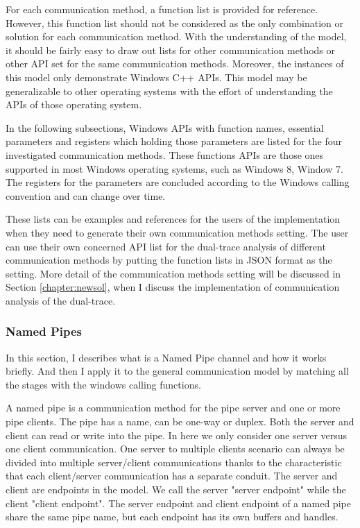 For each communication method, a function list is provided for reference. However, this function list should not be considered as the only combination or solution for each communication method. With the understanding of the model, it should be fairly easy to draw out lists for other
communication methods or other API set for the same communication methods. Moreover, the
instances of this model only demonstrate Windows C++ APIs. This model may be generalizable
to other operating systems with the effort of understanding the APIs of those operating system.

In the following subsections, Windows APIs with function names, essential parameters and
registers which holding those parameters are listed for the four investigated communication methods. These functions APIs are those ones supported in most Windows operating systems, such as
Windows 8, Window 7. The registers for the parameters are concluded according to the Windows
calling convention and can change over time.

These lists can be examples and references for the users of the implementation when they need
to generate their own communication methods setting. The user can use their own concerned API
list for the dual-trace analysis of different communication methods by putting the function lists
in JSON format as the setting. More detail of the communication methods setting will be discussed in Section \ref{chapter:newsol}, when I discuss the implementation of communication analysis of the dual-trace.

\subsubsection{Named Pipes}
In this section, I describes what is a Named Pipe channel and how it works briefly. And then I apply it to the general communication model by matching all the stages with the windows calling functions.

A named pipe is a communication method for the pipe server and one or more pipe clients. The pipe has a name, can be one-way or duplex. Both the server and client can read or write into the pipe.\cite{WinNamedpipe} In here we only consider one server versus one client communication. One server to multiple clients scenario can always be divided into multiple server/client communications thanks to the characteristic that each client/server communication has a separate conduit. The server and client are endpoints in the model. We call the server "server endpoint" while the client "client endpoint". The server endpoint and client endpoint of a named pipe share the same pipe name, but each endpoint has its own buffers and handles. 


